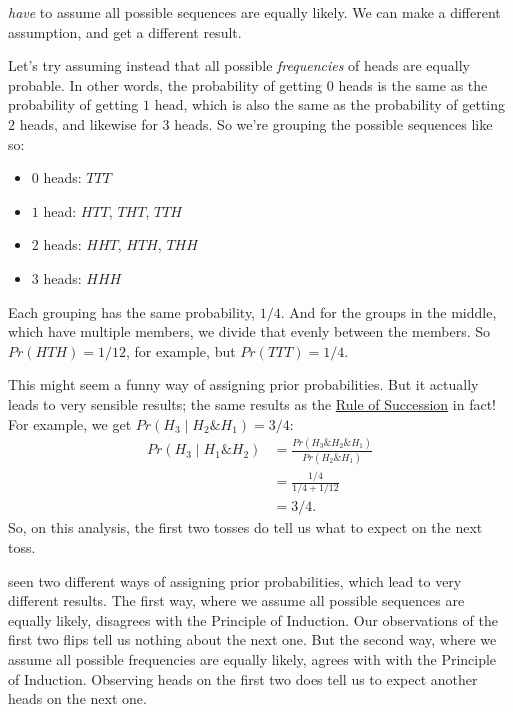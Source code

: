 \documentclass[justified]{tufte-book}
\providecommand{\tightlist}{%
  \setlength{\itemsep}{0pt}\setlength{\parskip}{0pt}}
\newcommand{\given}{\mid}
\renewcommand{\wedge}{\mathbin{\&}}
\newcommand{\p}{Pr}
\begin{document}
 \emph{have} to assume all possible sequences are equally likely. We can make a different assumption, and get a different result.

Let's try assuming instead that all possible \emph{frequencies} of heads are equally probable. In other words, the probability of getting \(0\) heads is the same as the probability of getting \(1\) head, which is also the same as the probability of getting \(2\) heads, and likewise for \(3\) heads. So we're grouping the possible sequences like so:

\begin{itemize}
\tightlist
\item
  \(0\) heads: \(TTT\)
\item
  \(1\) head: \(HTT\), \(THT\), \(TTH\)
\item
  \(2\) heads: \(HHT\), \(HTH\), \(THH\)
\item
  \(3\) heads: \(HHH\)
\end{itemize}

Each grouping has the same probability, \(1/4\). And for the groups in the middle, which have multiple members, we divide that evenly between the members. So \(\p(HTH) = 1/12\), for example, but \(\p(TTT) = 1/4\).

This might seem a funny way of assigning prior probabilities. But it actually leads to very sensible results; the same results as the \protect\hyperlink{succession}{Rule of Succession} in fact! For example, we get \(\p(H_3 \given H_2 \wedge H_1) = 3/4\):
\[
  \begin{aligned}
    \p(H_3 \given H_1 \wedge H_2)
      &= \frac{\p(H_3 \wedge H_2 \wedge H_1)}{\p(H_2 \wedge H_1)}\\
      &= \frac{1/4}{1/4 + 1/12}\\
      &= 3/4.
  \end{aligned}
\]
So, on this analysis, the first two tosses do tell us what to expect on the next toss.

 seen two different ways of assigning prior probabilities, which lead to very different results. The first way, where we assume all possible sequences are equally likely, disagrees with the Principle of Induction. Our observations of the first two flips tell us nothing about the next one. But the second way, where we assume all possible frequencies are equally likely, agrees with with the Principle of Induction. Observing heads on the first two does tell us to expect another heads on the next one.
\end{document}
